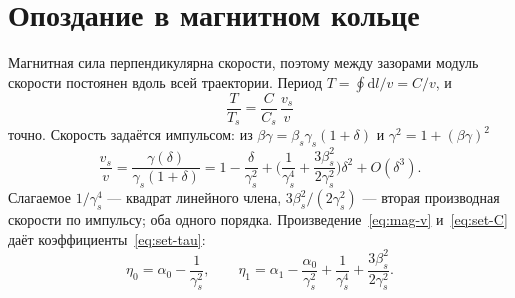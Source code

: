 \section{Опоздание в магнитном кольце}
\label{sec:mag}

Магнитная сила перпендикулярна скорости, поэтому между зазорами модуль скорости постоянен вдоль всей траектории. Период $T=\oint\mathrm{d}l/v=C/v$, и
\begin{equation}
\label{eq:mag-Tratio}
\frac{T}{T_s}=\frac{C}{C_s}\,\frac{v_s}{v}
\end{equation}
точно. Скорость задаётся импульсом: из $\beta\gamma=\beta_s\gamma_s(1+\delta)$ и $\gamma^2=1+(\beta\gamma)^2$
\begin{equation}
\label{eq:mag-v}
\frac{v_s}{v}=\frac{\gamma(\delta)}{\gamma_s(1+\delta)}
=1-\frac{\delta}{\gamma_s^2}+\Biggl(\frac{1}{\gamma_s^4}+\frac{3\beta_s^2}{2\gamma_s^2}\Biggr)\delta^2+O(\delta^3).
\end{equation}
Слагаемое $1/\gamma_s^4$ --- квадрат линейного члена, $3\beta_s^2/(2\gamma_s^2)$ --- вторая производная скорости по импульсу; оба одного порядка. Произведение~\eqref{eq:mag-v} и~\eqref{eq:set-C} даёт коэффициенты~\eqref{eq:set-tau}:
\begin{equation}
\label{eq:mag-eta}
\eta_0=\alpha_0-\frac{1}{\gamma_s^2},
\qquad
\eta_1=\alpha_1-\frac{\alpha_0}{\gamma_s^2}+\frac{1}{\gamma_s^4}+\frac{3\beta_s^2}{2\gamma_s^2}.
\end{equation}
